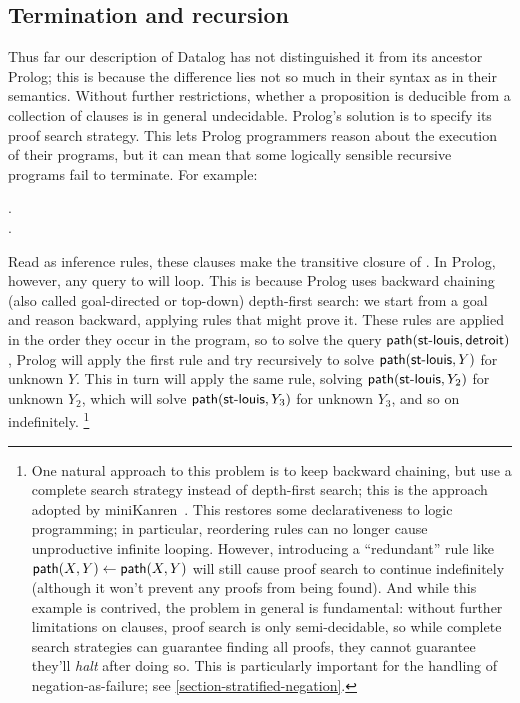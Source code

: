 


\subsection{Termination and recursion}

Thus far our description of Datalog has not distinguished it from its ancestor
Prolog; this is because the difference lies not so much in their syntax as in
their semantics.
%
Without further restrictions, whether a proposition is deducible from a
collection of clauses is in general undecidable.
%
Prolog's solution is to specify its proof search strategy.
%
This lets Prolog programmers reason about the execution of their programs, but
it can mean that some logically sensible recursive programs fail to terminate.
For example:

\begin{datalog}
 \gets {} \conj {}.\\
 \gets {}.
\end{datalog}

\noindent
Read as inference rules, these clauses make  the transitive closure
of .
%
In Prolog, however, any query to  will loop.
%
This is because Prolog uses backward chaining (also called goal-directed or
top-down) depth-first search: we start from a goal and reason backward, applying
rules that might prove it.
%
These rules are applied in the order they occur in the program, so to solve the
query $\text{\sffamily path}({\textsf{st-louis}, \textsf{detroit}})$, Prolog will apply the
first rule and try recursively to solve $\text{\sffamily path}({\textsf{st-louis},Y})$ for
unknown $Y$.
%
This in turn will apply the same rule, solving $\text{\sffamily path}({\textsf{st-louis},
  Y_2})$ for unknown $Y_2$, which will solve $\text{\sffamily path}({\textsf{st-louis}, Y_3})$
for unknown $Y_3$, and so on indefinitely.%
%
\footnote{One natural approach to this problem is to keep backward chaining, but
  use a complete search strategy instead of depth-first search; this is the
  approach adopted by miniKanren~\citep{kanren}. This restores some
  declarativeness to logic programming; in particular, reordering rules can no
  longer cause unproductive infinite looping. However, introducing a
  ``redundant'' rule like $\text{\sffamily path}({X,Y}) \gets \text{\sffamily path}({X,Y})$ will still
  cause proof search to continue indefinitely (although it won't prevent any
  proofs from being found). And while this example is contrived, the problem in
  general is fundamental: without further limitations on clauses, proof search
  is only semi-decidable, so while complete search strategies can guarantee
  finding all proofs, they cannot guarantee they'll \emph{halt} after doing so.
  This is particularly important for the handling of negation-as-failure; see
  \cref{section-stratified-negation}.}

